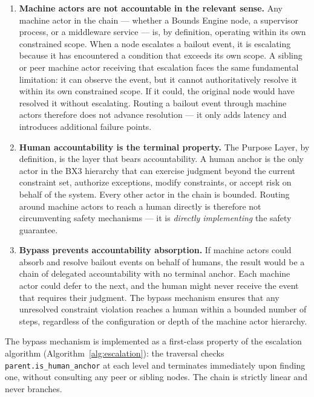 \begin{enumerate}
    \item \textbf{Machine actors are not accountable in the relevant sense.} Any machine actor in the chain — whether a Bounds Engine node, a supervisor process, or a middleware service — is, by definition, operating within its own constrained scope. When a node escalates a bailout event, it is escalating because it has encountered a condition that exceeds its own scope. A sibling or peer machine actor receiving that escalation faces the same fundamental limitation: it can observe the event, but it cannot authoritatively resolve it within its own constrained scope. If it could, the original node would have resolved it without escalating. Routing a bailout event through machine actors therefore does not advance resolution — it only adds latency and introduces additional failure points.

    \item \textbf{Human accountability is the terminal property.} The Purpose Layer, by definition, is the layer that bears accountability. A human anchor is the only actor in the BX3 hierarchy that can exercise judgment beyond the current constraint set, authorize exceptions, modify constraints, or accept risk on behalf of the system. Every other actor in the chain is bounded. Routing around machine actors to reach a human directly is therefore not circumventing safety mechanisms — it is \textit{directly implementing} the safety guarantee.

    \item \textbf{Bypass prevents accountability absorption.} If machine actors could absorb and resolve bailout events on behalf of humans, the result would be a chain of delegated accountability with no terminal anchor. Each machine actor could defer to the next, and the human might never receive the event that requires their judgment. The bypass mechanism ensures that any unresolved constraint violation reaches a human within a bounded number of steps, regardless of the configuration or depth of the machine actor hierarchy.
\end{enumerate}

The bypass mechanism is implemented as a first-class property of the escalation algorithm (Algorithm~\ref{alg:escalation}): the traversal checks \texttt{parent.is\_human\_anchor} at each level and terminates immediately upon finding one, without consulting any peer or sibling nodes. The chain is strictly linear and never branches.

